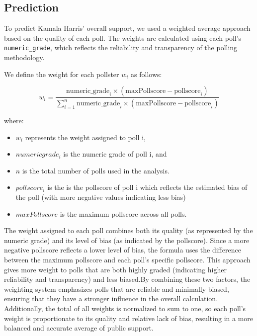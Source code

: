 \documentclass[
  letterpaper,
  DIV=11,
  numbers=noendperiod]{scrartcl}
\begin{document}
\hypertarget{prediction}{%
\subsection{Prediction}\label{prediction}}

To predict Kamala Harris' overall support, we used a weighted average
approach based on the quality of each poll. The weights are calculated
using each poll's \texttt{numeric\_grade}, which reflects the
reliability and transparency of the polling methodology.

We define the weight for each pollster \(w_i\) as follows:

\[
w_i = \frac{\mathrm{numeric\_grade}_i \times (\mathrm{maxPollscore} - \mathrm{pollscore}_i)}{\sum_{i=1}^{n} \mathrm{numeric\_grade}_i \times (\mathrm{maxPollscore} - \mathrm{pollscore}_i)}
\]

where:

\begin{itemize}
\item
  \(w_i\) represents the weight assigned to poll i,
\item
  \(numericgrade_i\) is the numeric grade of poll i, and
\item
  \(n\) is the total number of polls used in the analysis.
\item
  \(pollscore_i\) is the is the pollscore of poll i which reflects the
  estimated bias of the poll (with more negative values indicating less
  bias)
\item
  \(maxPollscore\) is the maximum pollscore across all polls.
\end{itemize}

The weight assigned to each poll combines both its quality (as
represented by the numeric grade) and its level of bias (as indicated by
the pollscore). Since a more negative pollscore reflects a lower level
of bias, the formula uses the difference between the maximum pollscore
and each poll's specific pollscore. This approach gives more weight to
polls that are both highly graded (indicating higher reliability and
transparency) and less biased.By combining these two factors, the
weighting system emphasizes polls that are reliable and minimally
biased, ensuring that they have a stronger influence in the overall
calculation. Additionally, the total of all weights is normalized to sum
to one, so each poll's weight is proportionate to its quality and
relative lack of bias, resulting in a more balanced and accurate average
of public support.
\end{document}
